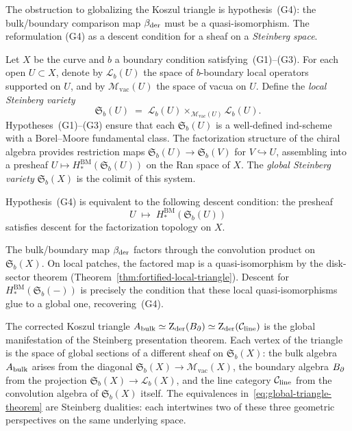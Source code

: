 \providecommand{\fS}{\mathfrak{S}}
\providecommand{\cL}{\mathcal{L}}
\providecommand{\Mvac}{\mathcal{M}_{\mathrm{vac}}}

The obstruction to globalizing the Koszul triangle is
hypothesis~(G4): the bulk/boundary comparison map
$\beta_{\mathrm{der}}$ must be a quasi-isomorphism.
The reformulation (G4) as a descent condition
for a sheaf on a \emph{Steinberg space}.

\begin{construction}
Let $X$ be the curve and $b$ a boundary condition
satisfying~(G1)--(G3).
For each open $U\subset X$, denote by
$\cL_b(U)$ the space of $b$-boundary local operators
supported on $U$, and by $\Mvac(U)$ the space of
vacua on $U$. Define the \emph{local Steinberg variety}
\[
\fS_b(U)
\;=\;
\cL_b(U)\times_{\Mvac(U)}\cL_b(U).
\]
Hypotheses~(G1)--(G3) ensure that each
$\fS_b(U)$ is a well-defined ind-scheme
with a Borel--Moore fundamental class.
The factorization structure of the chiral algebra
provides restriction maps
$\fS_b(U)\to\fS_b(V)$ for $V\hookrightarrow U$,
assembling into a presheaf
$U\mapsto H_*^{\mathrm{BM}}(\fS_b(U))$
on the Ran space of $X$.
The \emph{global Steinberg variety}
$\fS_b(X)$ is the colimit of this system.
\end{construction}

\begin{conjecture}[\ClaimStatusConjectured]
Hypothesis~\textup{(G4)} is equivalent to the
following descent condition: the presheaf
\[
U\;\longmapsto\;H_*^{\mathrm{BM}}(\fS_b(U))
\]
satisfies descent for the factorization topology on $X$.
\end{conjecture}

\begin{remark}[Sketch]
The bulk/boundary map $\beta_{\mathrm{der}}$ factors through
the convolution product on $\fS_b(X)$.
On local patches, the factored map is a
quasi-isomorphism by the disk-sector theorem
(Theorem~\ref{thm:fortified-local-triangle}).
Descent for $H_*^{\mathrm{BM}}(\fS_b(-))$
is precisely the condition that these local
quasi-isomorphisms glue to a global one,
recovering~(G4).
\end{remark}

\begin{remark}
The corrected Koszul triangle
$A_{\mathrm{bulk}}\simeq\operatorname{Z}_{\mathrm{der}}(B_{\partial})\simeq\operatorname{Z}_{\mathrm{der}}(\mathcal C_{\mathrm{line}})$
is the global manifestation of the Steinberg
presentation theorem. Each vertex of the triangle
is the space of global sections of a different
sheaf on $\fS_b(X)$:
the bulk algebra $A_{\mathrm{bulk}}$ arises from the
diagonal $\fS_b(X)\to\Mvac(X)$,
the boundary algebra $B_{\partial}$ from the projection
$\fS_b(X)\to\cL_b(X)$,
and the line category $\mathcal C_{\mathrm{line}}$ from
the convolution algebra of $\fS_b(X)$ itself.
The equivalences in~\eqref{eq:global-triangle-theorem}
are Steinberg dualities:
each intertwines two of these three
geometric perspectives on the same underlying space.
\end{remark}


